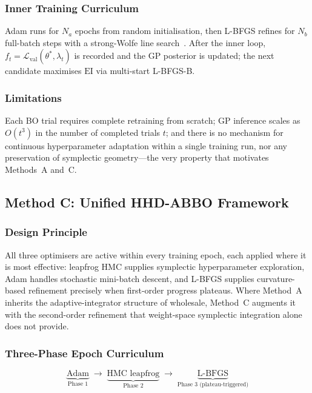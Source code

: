 \documentclass[11pt]{article}
\theoremstyle{definition}
\newcommand{\calL}{\mathcal{L}}
\newcommand{\EI}{\mathrm{EI}}
\begin{document}
\subsubsection{Inner Training Curriculum}

Adam runs for $N_a$ epochs from random initialisation, then L-BFGS
refines for $N_b$ full-batch steps with a strong-Wolfe line
search~\cite{wolfe1969}. After the inner loop,
$f_t=\calL_{\mathrm{val}}(\theta^*,\lambda_t)$ is recorded and the GP
posterior is updated; the next candidate maximises $\EI$ via
multi-start L-BFGS-B.

\subsubsection{Limitations}

Each BO trial requires complete retraining from scratch; GP
inference scales as $O(t^3)$ in the number of completed trials $t$;
and there is no mechanism for continuous hyperparameter adaptation
within a single training run, nor any preservation of symplectic
geometry---the very property that motivates Methods~A and~C.

\subsection{Method C: Unified HHD-ABBO Framework}

\subsubsection{Design Principle}

All three optimisers are active within every training epoch, each
applied where it is most effective: leapfrog HMC supplies symplectic
hyperparameter exploration, Adam handles stochastic mini-batch
descent, and L-BFGS supplies curvature-based refinement precisely
when first-order progress plateaus. Where Method~A inherits the
adaptive-integrator structure of \cite{duruisseaux2021adaptive}
wholesale, Method~C augments it with the second-order refinement that
weight-space symplectic integration alone does not provide.

\subsubsection{Three-Phase Epoch Curriculum}

\begin{equation}
\underbrace{\text{Adam}}_{\text{Phase 1}}
\;\longrightarrow\;
\underbrace{\text{HMC leapfrog}}_{\text{Phase 2}}
\;\longrightarrow\;
\underbrace{\text{L-BFGS}}_{\text{Phase 3 (plateau-triggered)}}
\label{eq:curriculum}
\end{equation}
\end{document}
